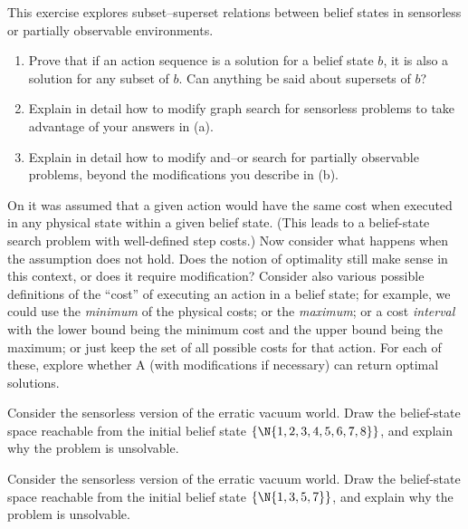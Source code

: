 \begin{exercise}
This exercise explores subset--superset relations between belief states in sensorless or partially observable environments.
\begin{enumerate}
\item Prove that if an action sequence is a solution for a belief state \(b\), it is also a solution for any subset of \(b\). Can anything be said about supersets of \(b\)?
\item Explain in detail how to modify graph search for sensorless problems to take advantage of your answers in (a).
\item Explain in detail how to modify {\sc and--or} search for partially observable problems, beyond the
modifications you describe in (b).
\end{enumerate}
\end{exercise} 

\begin{exercise}
On  it was assumed that a given
action would have the same cost when executed in any physical state
within a given belief state. (This leads to a belief-state search
problem with well-defined step costs.) Now consider what happens when
the assumption does not hold. Does the notion of optimality still make
sense in this context, or does it require modification?  Consider also
various possible definitions of the ``cost'' of executing an action in
a belief state; for example, we could use the {\em minimum} of the
physical costs; or the {\em maximum}; or a cost {\em interval} with
the lower bound being the minimum cost and the upper bound being the
maximum; or just keep the set of all possible costs for that
action. For each of these, explore whether A{\star} (with modifications if
necessary) can return optimal solutions.
\end{exercise} 

\begin{uexercise}%
Consider the sensorless version of the erratic vacuum world.
Draw the belief-state space reachable from the initial belief state 
\(\{\N{1,2,3,4,5,6,7,8}\}\), and explain why the problem is unsolvable.
\end{uexercise} 

\begin{iexercise}%
Consider the sensorless version of the erratic vacuum world.
Draw the belief-state space reachable from the initial belief state 
\(\{\N{1,3,5,7}\}\), and explain why the problem is unsolvable.
\end{iexercise} 

